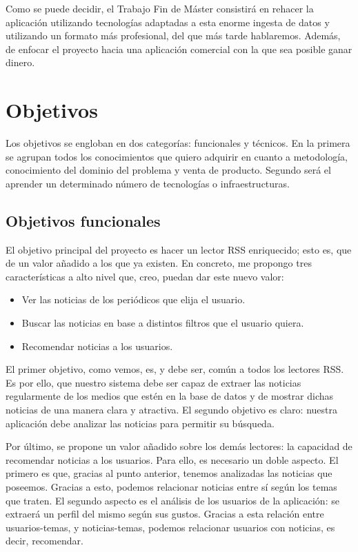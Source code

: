 Como se puede decidir, el Trabajo Fin de Máster consistirá en rehacer la aplicación utilizando tecnologías adaptadas a esta enorme ingesta de datos y utilizando un formato más profesional, del que más tarde hablaremos. Además, de enfocar el proyecto hacia una aplicación comercial con la que sea posible ganar dinero.


\section{Objetivos}\label{sec:objetivos}

Los objetivos se engloban en dos categorías: funcionales y técnicos. En la primera se agrupan todos los conocimientos que quiero adquirir en cuanto a metodología, conocimiento del dominio del problema y venta de producto. Segundo será el aprender un determinado número de tecnologías o infraestructuras.


\subsection{Objetivos funcionales}

El objetivo principal del proyecto es hacer un lector RSS enriquecido; esto es, que de un valor añadido a los que ya existen. En concreto, me propongo tres características a alto nivel que, creo, puedan dar este nuevo valor:

\begin{itemize}
	\item Ver las noticias de los periódicos que elija el usuario.
	\item Buscar las noticias en base a distintos filtros que el usuario quiera.
	\item Recomendar noticias a los usuarios.
\end{itemize}

El primer objetivo, como vemos, es, y debe ser, común a todos los lectores RSS. Es por ello, que nuestro sistema debe ser capaz de extraer las noticias regularmente de los medios que estén en la base de datos y de mostrar dichas noticias de una manera clara y atractiva. El segundo objetivo es claro: nuestra aplicación debe analizar las noticias para permitir su búsqueda.

Por último, se propone un valor añadido sobre los demás lectores: la capacidad de recomendar noticias a los usuarios. Para ello, es necesario un doble aspecto. El primero es que, gracias al punto anterior, tenemos analizadas las noticias que poseemos. Gracias a esto, podemos relacionar noticias entre sí según los temas que traten. El segundo aspecto es el análisis de los usuarios de la aplicación: se extraerá un perfil del mismo según sus gustos. Gracias a esta relación entre usuarios-temas, y noticias-temas, podemos relacionar usuarios con noticias, es decir, recomendar.

